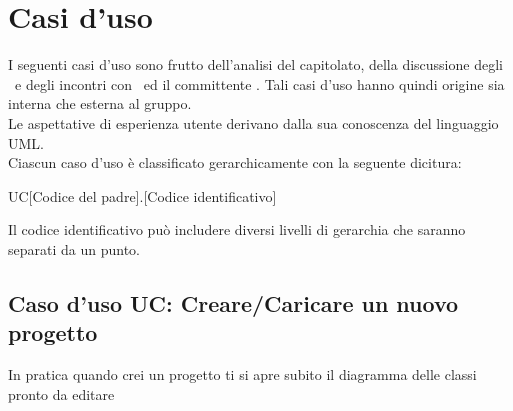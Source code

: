 \documentclass[../AnalisiDeiRequisiti.tex]{subfiles}
\begin{document}
	\section{Casi d'uso }
	I seguenti casi d'uso sono frutto dell'analisi del capitolato, della discussione degli
	\analisti\ e degli incontri con	\proponente\ ed il committente \vardanega.
	Tali casi d'uso hanno quindi origine sia interna che esterna al gruppo.\\
	Le aspettative di esperienza utente derivano dalla sua conoscenza del
	linguaggio UML.\\
	Ciascun caso d'uso è classificato gerarchicamente con la seguente dicitura:
	\begin{center}
		UC[Codice del padre].[Codice identificativo]
	\end{center}
	Il codice identificativo può includere diversi livelli di gerarchia che saranno
	separati da un punto.
	
	\subsection{Caso d'uso UC: Creare/Caricare un nuovo progetto}
		In pratica quando crei un progetto ti si apre subito il diagramma delle classi pronto da editare
\end{document}
